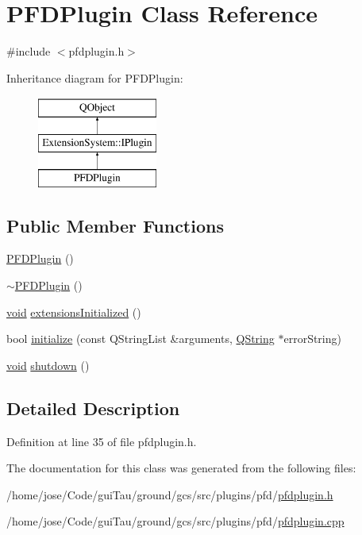 \hypertarget{class_p_f_d_plugin}{\section{P\-F\-D\-Plugin Class Reference}
\label{class_p_f_d_plugin}
}


{\ttfamily \#include $<$pfdplugin.\-h$>$}

Inheritance diagram for P\-F\-D\-Plugin\-:\begin{figure}[H]
\begin{center}
\leavevmode
\includegraphics[height=3.000000cm]{class_p_f_d_plugin}
\end{center}
\end{figure}
\subsection*{Public Member Functions}
\begin{DoxyCompactItemize}
\item 
\hyperlink{group___o_p_map_plugin_gaae905eda9a2b7787c1c4bde899b1d9ad}{P\-F\-D\-Plugin} ()
\item 
\hyperlink{group___o_p_map_plugin_ga87aa31c062c14f56bd9ef0cc4f656d89}{$\sim$\-P\-F\-D\-Plugin} ()
\item 
\hyperlink{group___u_a_v_objects_plugin_ga444cf2ff3f0ecbe028adce838d373f5c}{void} \hyperlink{group___o_p_map_plugin_ga4db36e2e23e4ade00fcf37bf863c4232}{extensions\-Initialized} ()
\item 
bool \hyperlink{group___o_p_map_plugin_ga9494fd7b5f521ffd086c63287ad01a18}{initialize} (const Q\-String\-List \&arguments, \hyperlink{group___u_a_v_objects_plugin_gab9d252f49c333c94a72f97ce3105a32d}{Q\-String} $\ast$error\-String)
\item 
\hyperlink{group___u_a_v_objects_plugin_ga444cf2ff3f0ecbe028adce838d373f5c}{void} \hyperlink{group___o_p_map_plugin_ga378193e80b5473898ab8a75bbfe0d4bb}{shutdown} ()
\end{DoxyCompactItemize}


\subsection{Detailed Description}


Definition at line 35 of file pfdplugin.\-h.



The documentation for this class was generated from the following files\-:\begin{DoxyCompactItemize}
\item 
/home/jose/\-Code/gui\-Tau/ground/gcs/src/plugins/pfd/\hyperlink{pfdplugin_8h}{pfdplugin.\-h}\item 
/home/jose/\-Code/gui\-Tau/ground/gcs/src/plugins/pfd/\hyperlink{pfdplugin_8cpp}{pfdplugin.\-cpp}\end{DoxyCompactItemize}
